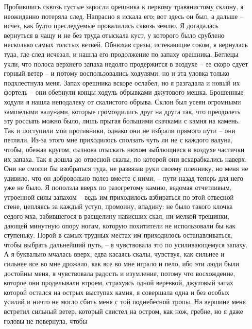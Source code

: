 Пробившись  сквозь  густые  заросли  орешника  к  первому  травянистому
склону, я неожиданно потеряла след. Напрасно я искала его; вот здесь он был,
а  дальше  --  исчез,  как  будто  преследуемые  провалились сквозь землю. Я
догадалась вернуться в чащу и не без труда отыскала куст,  у  которого  было
срублено  несколько самых толстых ветвей. Обнюхав срезы, истекающие соком, я
вернулась туда,  где  след  исчезал,  и  нашла  его  продолжение  по  запаху
орешника.  Беглецы  учли,  что  полоса верхнего запаха недолго продержится в
воздухе -- ее скоро сдует горный ветер -- и потому воспользовались ходулями,
но и эта уловка только подхлестнула меня. Запах орешника вскоре ослабел,  но
я  разгадала  и  новый  их  фортель  --  они обернули концы ходуль обрывками
джутового мешка. Брошенные ходули я нашла неподалеку от  скалистого  обрыва.
Склон  был  усеян огромными замшелыми валунами, которые громоздились друг на
друга так, что преодолеть эту  россыпь  можно  было,  лишь  прыгая  большими
скачками  с  камня  на камень. Так и поступили мои противники, однако они не
избрали прямого пути -- они петляли. Из-за этого  мне  приходилось  сползать
чуть  ли  не  с каждого валуна, чтобы, обежав кругом, сызнова отыскать нюхом
зыблющиеся в воздухе частички их запаха. Так я дошла до отвесной  скалы,  по
которой  они  вскарабкались  наверх.  Они  не  смогли бы взобраться туда, не
развязав руки своему пленнику, но меня не удивило, что он добровольно  полез
вместе  с  ними, -- пути назад теперь для него уже не было. Я поползла вверх
по разогретому камню, ведомая отчетливым, утроенной силы запахом -- ведь  им
приходилось  взбираться  по  этой  отвесной стене, цепляясь за каждый уступ,
промоину, впадину: не было такого клочка седого мха, забившегося в расщелину
нависших скал, ни мелкой трещинки,  дающей  минутную  опору  ногам,  которую
похитители не использовали бы как ступеньку. Порой в самых трудных местах им
приходилось останавливаться, чтобы выбрать дальнейший путь, -- я чувствовала
это  по  усиливающемуся  запаху.  А  я буквально мчалась вверх, едва касаясь
скалы, чувствуя, как сильнее и сильнее все во мне дрожало, как  все  во  мне
играло  и  пело,  ибо  эти  люди были достойны меня, я чувствовала радость и
изумление, потому что восхождение, которое они проделывали втроем, страхуясь
одной веревкой, джутовый запах которой остался на острых выступах  камня,  я
совершала  одна  и  без  особых  усилий  и  ничто  не могло сбить меня с той
поднебесной тропы. На вершине меня встретил сильный ветер,  который  свистел
на   остром,  как  нож,  гребне,  но  я  даже  головы  не  повернула,  чтобы
